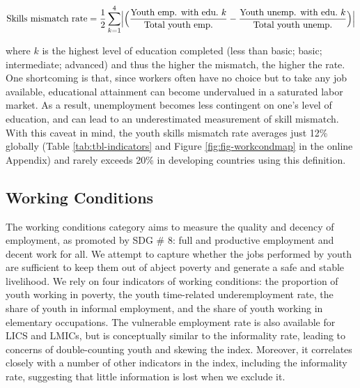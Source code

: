 \documentclass[
  a4paper, twoside, 12pt]{book}
\begin{document}
\footnotesize

\[\text{Skills mismatch rate}= \frac{1}{2} \sum_{k=1}^4 \Bigl| \Bigl(\frac{\text{Youth emp. with edu.} \ k}{\text{Total youth emp.}}- \frac{\text{Youth unemp. with edu.} \ k}{\text{Total youth unemp.}}\Bigl)\Bigl|\]
\normalsize
\vspace*{5pt}

where \(k\) is the highest level of education completed (less than basic; basic; intermediate; advanced) and thus the higher the mismatch, the higher the rate. One shortcoming is that, since workers often have no choice but to take any job available, educational attainment can become undervalued in a saturated labor market. As a result, unemployment becomes less contingent on one's level of education, and can lead to an underestimated measurement of skill mismatch. With this caveat in mind, the youth skills mismatch rate averages just 12\% globally (Table \ref{tab:tbl-indicators} and Figure \ref{fig:fig-workcondmap} in the online Appendix) and rarely exceeds 20\% in developing countries using this definition.

\hypertarget{working-conditions}{%
\subsection{Working Conditions}\label{working-conditions}}

The working conditions category aims to measure the quality and decency of employment, as promoted by SDG \# 8: full and productive employment and decent work for all. We attempt to capture whether the jobs performed by youth are sufficient to keep them out of abject poverty and generate a safe and stable livelihood. We rely on four indicators of working conditions: the proportion of youth working in poverty, the youth time-related underemployment rate, the share of youth in informal employment, and the share of youth working in elementary occupations. The vulnerable employment rate is also available for LICS and LMICs, but is conceptually similar to the informality rate, leading to concerns of double-counting youth and skewing the index. Moreover, it correlates closely with a number of other indicators in the index, including the informality rate, suggesting that little information is lost when we exclude it.
\end{document}
